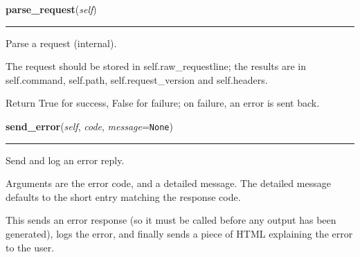     \label{BaseHTTPServer:BaseHTTPRequestHandler:parse_request}

    \vspace{0.5ex}

    \begin{boxedminipage}{\textwidth}

    \raggedright \textbf{parse\_request}(\textit{self})

    \vspace{-1.5ex}

    \rule{\textwidth}{0.5\fboxrule}
    Parse a request (internal).

    The request should be stored in self.raw\_requestline; the results are 
    in self.command, self.path, self.request\_version and self.headers.

    Return True for success, False for failure; on failure, an error is 
    sent back.

    \vspace{1ex}

    \end{boxedminipage}

    \label{BaseHTTPServer:BaseHTTPRequestHandler:send_error}

    \vspace{0.5ex}

    \begin{boxedminipage}{\textwidth}

    \raggedright \textbf{send\_error}(\textit{self}, \textit{code}, \textit{message}=\texttt{None})

    \vspace{-1.5ex}

    \rule{\textwidth}{0.5\fboxrule}
    Send and log an error reply.

    Arguments are the error code, and a detailed message. The detailed 
    message defaults to the short entry matching the response code.

    This sends an error response (so it must be called before any output 
    has been generated), logs the error, and finally sends a piece of HTML 
    explaining the error to the user.

    \vspace{1ex}

    \end{boxedminipage}

